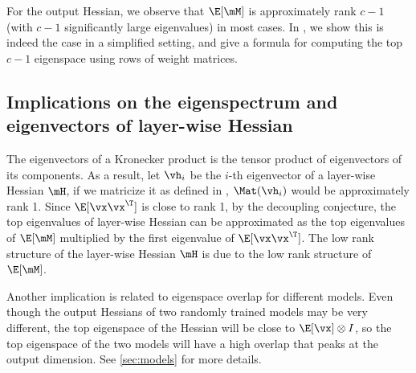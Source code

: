 For the output Hessian, we observe that $\E[\mM]$ is approximately rank $c-1$ (with $c-1$ significantly large eigenvalues) in most cases. In , we show this is indeed the case in a simplified setting, and give a formula for computing the top $c-1$ eigenspace using rows of weight matrices. %

%

\subsection{Implications on the eigenspectrum and eigenvectors of layer-wise Hessian}
\label{sec:conjecture-implication}
The eigenvectors of a Kronecker product is the tensor product of eigenvectors of its components. As a result, let $\vh_i$ be the $i$-th eigenvector of a layer-wise Hessian $\mH$, if we matricize it as defined in %
,
$\Mat(\vh_i)$ would be approximately rank 1. Since $\E[\vx\vx^\T]$ is close to rank 1, by the decoupling conjecture, the top eigenvalues of layer-wise Hessian can be approximated as the top eigenvalues of $\E[\mM]$ multiplied by the first eigenvalue of $\E[\vx\vx^\T]$. %
The low rank structure of the layer-wise Hessian $\mH$ is due to the low rank structure of $\E[\mM]$.


Another implication is related to eigenspace overlap for different models. Even though the output Hessians of two randomly trained models may be very different, the top eigenspace of the Hessian will be close to $\E[\vx]\otimes I$, so the top eigenspace of the two models will have a high overlap that peaks at the output dimension. See \cref{sec:models} for more details.



